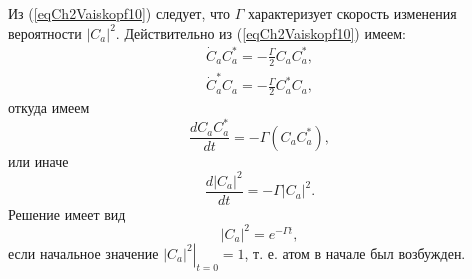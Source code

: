 Из (\ref{eqCh2Vaiskopf10}) следует, что $\Gamma$ характеризует
скорость изменения вероятности $\left|C_{a}\right|^2$. Действительно
из (\ref{eqCh2Vaiskopf10}) имеем:
\begin{eqnarray}
\dot{C}_{a}C_{a}^{*} = - \frac{\Gamma}{2}C_{a}C_{a}^{*},
\nonumber \\
\dot{C}_{a}^{*}C_{a} = - \frac{\Gamma}{2}C_{a}^{*}C_{a},
\nonumber
\end{eqnarray}
откуда имеем
\begin{equation}
\frac{d C_{a}C_{a}^{*}}{dt} = -\Gamma \left(C_{a}C_{a}^{*}\right),
\nonumber
\end{equation}
или иначе
\begin{equation}
\frac{d \left|C_{a}\right|^2}{dt} = -\Gamma \left|C_{a}\right|^2.
\nonumber
\end{equation}
Решение имеет вид 
\[
\left|C_{a}\right|^2 = e^{- \Gamma t},
\]
если начальное значение $\left.\left|C_{a}\right|^2\right|_{t = 0} =
1$, т. е. атом в начале был возбужден.




